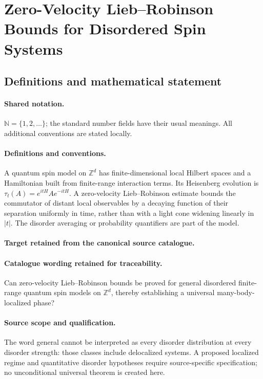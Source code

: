 \documentclass[11pt]{article}
\begin{document}
\section{Zero-Velocity Lieb–Robinson Bounds for Disordered Spin Systems}\label{statement}

\subsection{Definitions and mathematical statement}

\paragraph{Shared notation.}$\mathbb N=\{1,2,\ldots\}$; the standard number fields have their usual meanings. All additional conventions are stated locally.


\paragraph{Definitions and conventions.}
A quantum spin model on $\mathbb Z^d$ has finite-dimensional local Hilbert spaces and a Hamiltonian built from finite-range interaction terms. Its Heisenberg evolution is $\tau_t(A)=e^{itH}Ae^{-itH}$. A zero-velocity Lieb--Robinson estimate bounds the commutator of distant local observables by a decaying function of their separation uniformly in time, rather than with a light cone widening linearly in $|t|$. The disorder averaging or probability quantifiers are part of the model.

\paragraph{Target retained from the canonical source catalogue.}
\paragraph{Catalogue wording retained for traceability.}
Can zero-velocity Lieb–Robinson bounds be proved for general disordered finite-range quantum spin models on $\mathbb Z^d$, thereby establishing a universal many-body-localized phase?

\paragraph{Source scope and qualification.}
The word general cannot be interpreted as every disorder distribution at every disorder strength: those classes include delocalized systems. A proposed localized regime and quantitative disorder hypotheses require source-specific specification; no unconditional universal theorem is created here.
\end{document}
